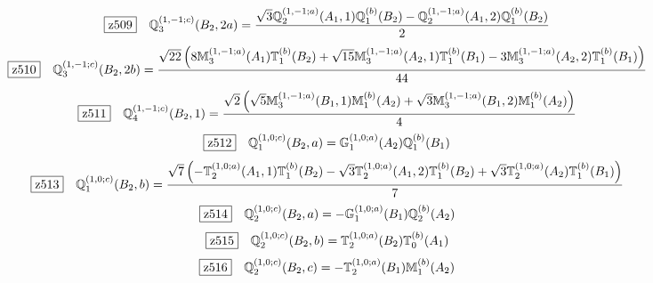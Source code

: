 \documentclass[fleqn,10pt,landscape]{jsarticle}
\begin{document}
\begin{dmath*}
\hspace*{3mm}\fbox{z509}\quad \mathbb{Q}_{3}^{(1,-1;c)}(B_{2},2a)=\frac{\sqrt{3} \mathbb{Q}_{2}^{(1,-1;a)}(A_{1},1) \mathbb{Q}_{1}^{(b)}(B_{2}) - \mathbb{Q}_{2}^{(1,-1;a)}(A_{1},2) \mathbb{Q}_{1}^{(b)}(B_{2})}{2}
\end{dmath*}
\begin{dmath*}
\hspace*{3mm}\fbox{z510}\quad \mathbb{Q}_{3}^{(1,-1;c)}(B_{2},2b)=\frac{\sqrt{22} \left(8 \mathbb{M}_{3}^{(1,-1;a)}(A_{1}) \mathbb{T}_{1}^{(b)}(B_{2}) + \sqrt{15} \mathbb{M}_{3}^{(1,-1;a)}(A_{2},1) \mathbb{T}_{1}^{(b)}(B_{1}) - 3 \mathbb{M}_{3}^{(1,-1;a)}(A_{2},2) \mathbb{T}_{1}^{(b)}(B_{1})\right)}{44}
\end{dmath*}
\begin{dmath*}
\hspace*{3mm}\fbox{z511}\quad \mathbb{Q}_{4}^{(1,-1;c)}(B_{2},1)=\frac{\sqrt{2} \left(\sqrt{5} \mathbb{M}_{3}^{(1,-1;a)}(B_{1},1) \mathbb{M}_{1}^{(b)}(A_{2}) + \sqrt{3} \mathbb{M}_{3}^{(1,-1;a)}(B_{1},2) \mathbb{M}_{1}^{(b)}(A_{2})\right)}{4}
\end{dmath*}
\begin{dmath*}
\hspace*{3mm}\fbox{z512}\quad \mathbb{Q}_{1}^{(1,0;c)}(B_{2},a)=\mathbb{G}_{1}^{(1,0;a)}(A_{2}) \mathbb{Q}_{1}^{(b)}(B_{1})
\end{dmath*}
\begin{dmath*}
\hspace*{3mm}\fbox{z513}\quad \mathbb{Q}_{1}^{(1,0;c)}(B_{2},b)=\frac{\sqrt{7} \left(- \mathbb{T}_{2}^{(1,0;a)}(A_{1},1) \mathbb{T}_{1}^{(b)}(B_{2}) - \sqrt{3} \mathbb{T}_{2}^{(1,0;a)}(A_{1},2) \mathbb{T}_{1}^{(b)}(B_{2}) + \sqrt{3} \mathbb{T}_{2}^{(1,0;a)}(A_{2}) \mathbb{T}_{1}^{(b)}(B_{1})\right)}{7}
\end{dmath*}
\begin{dmath*}
\hspace*{3mm}\fbox{z514}\quad \mathbb{Q}_{2}^{(1,0;c)}(B_{2},a)=- \mathbb{G}_{1}^{(1,0;a)}(B_{1}) \mathbb{Q}_{2}^{(b)}(A_{2})
\end{dmath*}
\begin{dmath*}
\hspace*{3mm}\fbox{z515}\quad \mathbb{Q}_{2}^{(1,0;c)}(B_{2},b)=\mathbb{T}_{2}^{(1,0;a)}(B_{2}) \mathbb{T}_{0}^{(b)}(A_{1})
\end{dmath*}
\begin{dmath*}
\hspace*{3mm}\fbox{z516}\quad \mathbb{Q}_{2}^{(1,0;c)}(B_{2},c)=- \mathbb{T}_{2}^{(1,0;a)}(B_{1}) \mathbb{M}_{1}^{(b)}(A_{2})
\end{dmath*}
\end{document}
